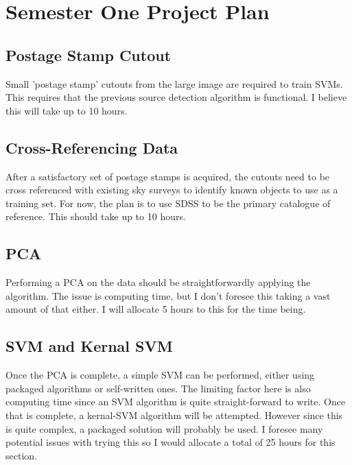 \documentclass[a4paper,fleqn,usenatbib]{mnras}
\begin{document}






%












\appendix

\section{Semester One Project Plan}
\label{App:project plan}
\subsection{Postage Stamp Cutout}
Small 'postage stamp' cutouts from the large image are required to train SVMs. This requires that the previous source detection algorithm is functional. I believe this will take up to 10 hours. 
\subsection{Cross-Referencing Data}
After a satisfactory set of postage stamps is acquired, the cutouts need to be cross referenced with existing sky surveys to identify known objects to use as a training set. For now, the plan is to use SDSS to be the primary catalogue of reference. This should take up to 10 hours.
\subsection{PCA}
Performing a PCA on the data should be straightforwardly applying the algorithm. The issue is computing time, but I don't foresee this taking a vast amount of that either. I will allocate 5 hours to this for the time being.
\subsection{SVM and Kernal SVM}
Once the PCA is complete, a simple SVM can be performed, either using packaged algorithms or self-written ones. The limiting factor here is also computing time since an SVM algorithm is quite straight-forward to write.
Once that is complete, a kernal-SVM algorithm will be attempted. However since this is quite complex, a packaged solution will probably be used. I foresee many potential issues with trying this so I would allocate a total of 25 hours for this section.
\end{document}
